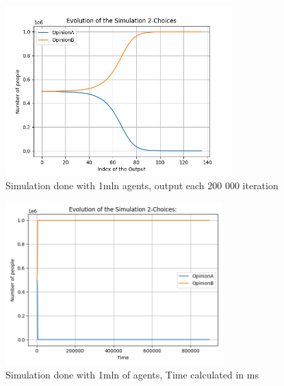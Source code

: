 \begin{figure}[H]
     \centering
     \includegraphics[width=0.78\textwidth,height=0.32\textheight]{img/svg/2Choices/1mln/withoutTime.png}
     \caption{Simulation done with 1mln agents, output each 200 000 iteration}
\end{figure}
\begin{figure}[H]
     \centering
     \includegraphics[width=0.75\textwidth,height=0.32\textheight]{img/svg/2Choices/1mln/withTime.png}
     \caption{Simulation done with 1mln of agents, Time calculated in ms}
\end{figure}


